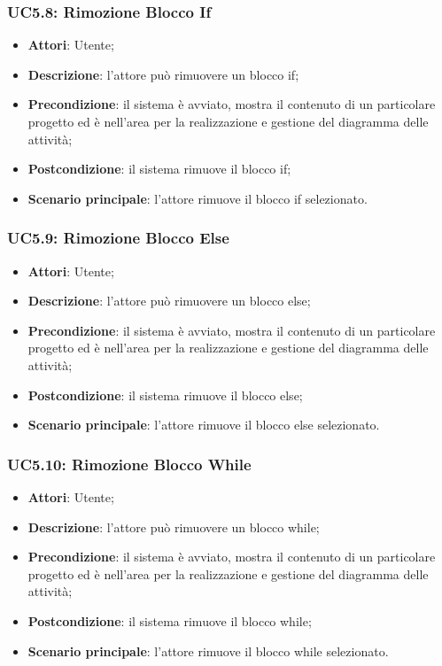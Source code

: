 \subsubsection{UC5.8: Rimozione Blocco If}
\label{UC5.8}
\begin{itemize}
	\item \textbf{Attori}: Utente;
	\item \textbf{Descrizione}: l'attore può rimuovere un blocco if;
	\item \textbf{Precondizione}: il sistema è avviato, mostra il contenuto di un particolare progetto ed è nell'area per la realizzazione e gestione del diagramma delle attività;
	\item \textbf{Postcondizione}: il sistema rimuove il blocco if;
	\item \textbf{Scenario principale}: l'attore rimuove il blocco if selezionato.
\end{itemize}

\subsubsection{UC5.9: Rimozione Blocco Else}
\label{UC5.9}
\begin{itemize}
	\item \textbf{Attori}: Utente;
	\item \textbf{Descrizione}: l'attore può rimuovere un blocco else;
	\item \textbf{Precondizione}: il sistema è avviato, mostra il contenuto di un particolare progetto ed è nell'area per la realizzazione e gestione del diagramma delle attività;
	\item \textbf{Postcondizione}: il sistema rimuove il blocco else;
	\item \textbf{Scenario principale}: l'attore rimuove il blocco else selezionato.
\end{itemize}

\subsubsection{UC5.10: Rimozione Blocco While}
\label{UC5.10}
\begin{itemize}
	\item \textbf{Attori}: Utente;
	\item \textbf{Descrizione}: l'attore può rimuovere un blocco while;
	\item \textbf{Precondizione}: il sistema è avviato, mostra il contenuto di un particolare progetto ed è nell'area per la realizzazione e gestione del diagramma delle attività;
	\item \textbf{Postcondizione}: il sistema rimuove il blocco while;
	\item \textbf{Scenario principale}: l'attore rimuove il blocco while selezionato.
\end{itemize}

